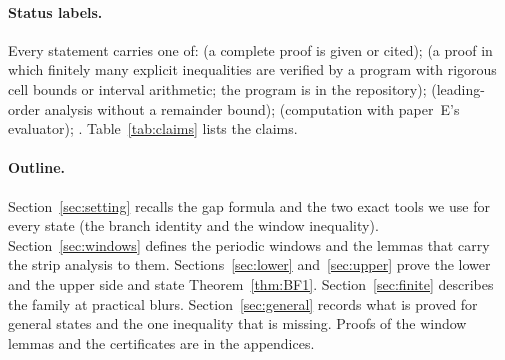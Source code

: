 \paragraph*{Status labels.}
Every statement carries one of: \proofst{} (a complete proof is given or cited);  (a proof in which
finitely many explicit inequalities are verified by a program with rigorous cell bounds or interval arithmetic; the program is in the
repository); \derivst{} (leading-order analysis without a remainder bound); \numst{} (computation with paper~E's evaluator);
\conjst. Table~\ref{tab:claims} lists the claims.

\paragraph*{Outline.}
Section~\ref{sec:setting} recalls the gap formula and the two exact tools we use for every state (the branch identity and the window
inequality). Section~\ref{sec:windows} defines the periodic windows and the lemmas that carry the strip analysis to them.
Sections~\ref{sec:lower} and~\ref{sec:upper} prove the lower and the upper side and state Theorem~\ref{thm:BF1}.
Section~\ref{sec:finite} describes the family at practical blurs. Section~\ref{sec:general} records what is proved for general states
and the one inequality that is missing. Proofs of the window lemmas and the certificates are in the appendices.

